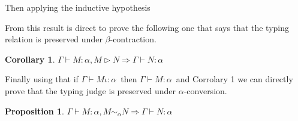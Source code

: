 \documentclass{article}
\newcommand{\alpeq}{\ensuremath{\sim_{\alpha}}}
\newtheorem{prop}{Proposition}
\newtheorem{coro}{Corollary}
\newcommand{\type}[3]{\ensuremath{#1 \vdash #2 : #3}}
\newcommand{\betacontr}[2]{\ensuremath{#1 \triangleright #2}}
\begin{document}
Then applying the inductive hypothesis



From this result is direct to prove the following one that says that the typing relation is preserved under $\beta$-contraction.

\begin{coro}
  $\type{\Gamma}{M}{\alpha}, \betacontr{M}{N} \Rightarrow \type{\Gamma}{N}{\alpha}$
\end{coro}

Finally using that if \type{\Gamma}{M \iota}{\alpha}\ then \type{\Gamma}{M}{\alpha}\ and Corrolary 1 we can directly prove that the typing judge is preserved under $\alpha$-conversion.

\begin{prop}
  $\type{\Gamma}{M}{\alpha}, M \alpeq N \Rightarrow \type{\Gamma}{N}{\alpha}$
\end{prop}
\end{document}

